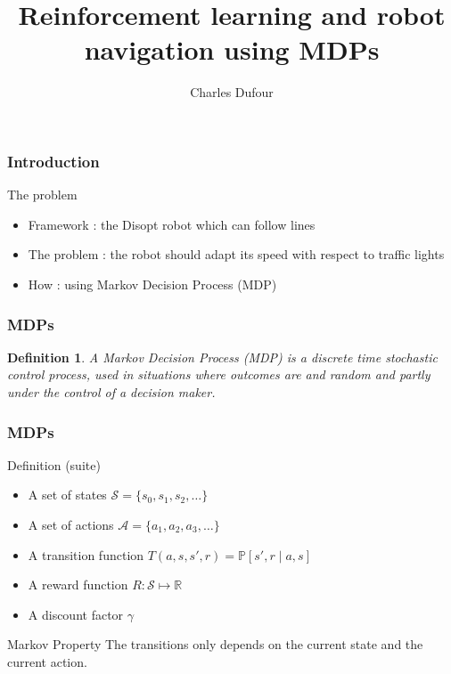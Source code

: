 \documentclass[dvipsnames,svgnames]{beamer}
\author{Charles Dufour}
\title{Reinforcement learning and robot navigation using MDPs}
\newtheorem{madef}{Definition}
\begin{document}
\begin{frame}
\titlepage
\end{frame}




\begin{frame}
\frametitle{Introduction}
\begin{block}{The problem}

  \begin{itemize}
   \item Framework : the Disopt robot which can follow lines
   \item The problem : the robot should adapt its speed with           respect to traffic lights
   \item How : using Markov Decision Process (MDP)
  \end{itemize}
\end{block} 
\end{frame}


\begin{frame}
\frametitle{MDPs}
\begin{madef}
A Markov Decision Process (MDP) is a discrete time stochastic control process, used in situations where outcomes are and random and partly under the control of a decision maker. 

\end{madef}
\end{frame}

\begin{frame}
\frametitle{MDPs}
\begin{block}{Definition (suite)}
\begin{itemize}
\item A set of states $\mathcal{S}=\{s_0,s_1,s_2,\ldots\}$
\item A set of actions $\mathcal{A}=\{a_1,a_2,a_3,\ldots\}$
\item A transition function $T(a,s,s',r) = \mathbb{P}[s',r\mid a,s]$
\item A reward function $R: \mathcal{S}\mapsto \mathbb{R}$
\item A discount factor $\gamma$ 
\end{itemize}
\end{block}

\begin{block}{Markov Property}
The transitions only depends on the current state and the current action.
\end{block}
\end{frame}
\end{document}
